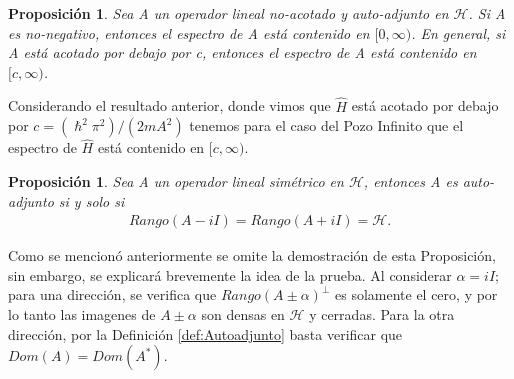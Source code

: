 \documentclass[12pt]{article}
\newtheorem{prop}[teo]{Proposición}
\theoremstyle{definition}
\begin{document}
\begin{prop}
    Sea A un operador lineal no-acotado y auto-adjunto en $\mathcal{H}$. Si A es no-negativo, entonces el espectro de A está contenido en $[0,\infty)$. En general, si A está acotado por debajo por c, entonces el espectro de A está contenido en $[c,\infty)$.
    \label{prop:IntEspectro}
\end{prop}
\noindent
Considerando el resultado anterior, donde vimos que $\hat{H}$ está acotado por debajo por $c = (\hslash^2\pi^2)/(2mA^2)$ tenemos para el caso del Pozo Infinito que el espectro de $\hat{H}$ está contenido en $\big[c, \infty\big)$.
\begin{prop}
    Sea A un operador lineal simétrico en $\mathcal{H}$, entonces A es auto-adjunto si y solo si
    \begin{align*}
        Rango(A-iI) = Rango (A+iI) = \mathcal{H}.
    \end{align*}
    \label{prop:RankAdj}
\end{prop}
\noindent
Como se mencionó anteriormente se omite la demostración de esta Proposición, sin embargo, se explicará brevemente la idea de la prueba. Al considerar $\alpha = iI$; para una dirección, se verifica que  $Rango(A\pm\alpha)^{\perp}$ es solamente el cero, y por lo tanto las imagenes de  $A\pm\alpha$ son densas en $\mathcal{H}$ y cerradas. Para la otra dirección, por la Definición \ref{def:Autoadjunto} basta verificar que $Dom(A) = Dom(A^*)$.
\end{document}
